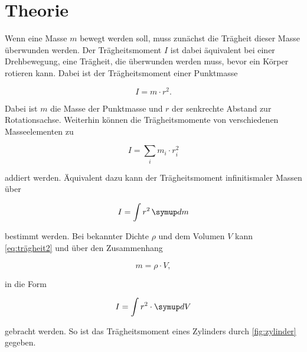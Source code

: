\section{Theorie}
\label{sec:Theorie}




Wenn eine Masse $m$ bewegt werden soll, muss zunächst die Trägheit dieser Masse überwunden werden. Der Trägheitsmoment $I$ ist dabei äquivalent bei einer Drehbewegung, eine Trägheit, die überwunden werden muss, bevor ein Körper rotieren kann. Dabei ist der Trägheitsmoment einer Punktmasse

\begin{equation}
    I = m \cdot r^2.
    \label{eq:trägheit1}
\end{equation}

Dabei ist $m$ die Masse der Punktmasse und $r$ der senkrechte Abstand zur Rotationsachse. Weiterhin können die Trägheitsmomente von verschiedenen Masseelementen zu 

\begin{equation}
    I = \sum _i m_i \cdot r_i^2
    \label{eq:trägheit1}
\end{equation}

addiert werden. Äquivalent dazu kann der Trägheitsmoment infinitismaler Massen über 

\begin{equation}
    I = \int r^2 \dif{m}
    \label{eq:trägheit2}
\end{equation}

bestimmt werden. Bei bekannter Dichte $\rho$ und dem Volumen $V$ kann \autoref{eq:trägheit2} und über den Zusammenhang

\begin{equation}
    m = \rho \cdot V,
    \label{eq:dichte}
\end{equation}

in die Form 

\begin{equation}
    I = \int r^2 \cdot \dif{V}
    \label{eq:trägheit2}
\end{equation}

gebracht werden. So ist das Trägheitsmoment eines Zylinders durch \autoref{fig:zylinder} gegeben.

